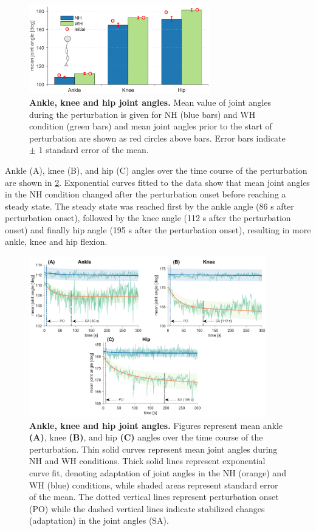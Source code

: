 \begin{figure}[!htb]
	\centering
	\includegraphics[width=0.7\textwidth]{Jernej/figures/jAnglesBars}
	\caption{\textbf{Ankle, knee and hip joint angles. }Mean value of joint angles during the perturbation is given for NH (blue bars) and WH condition (green bars) and mean joint angles prior to the start of perturbation are shown as red circles above bars. Error bars indicate $\pm$ 1 standard error of the mean.
	}
	\label{fig:jAnglesBars}
\end{figure}

Ankle (A), knee (B), and hip (C) angles over the time course of the perturbation are shown in \FigureAbbr \ref{fig:expFit}. Exponential curves fitted to the data show that mean joint angles in the NH condition changed after the perturbation onset before reaching a steady state. The steady state was reached first by the ankle angle (86 s after perturbation onset), followed by the knee angle (112 s after the perturbation onset) and finally hip angle (195 s after the perturbation onset), resulting in more ankle, knee and hip flexion.

\begin{figure}[!htb]
	\centering
	\includegraphics[width=0.92\textwidth]{Jernej/figures/expFit}
	\caption{\textbf{Ankle, knee and hip joint angles. }Figures represent mean ankle \textbf{(A)}, knee \textbf{(B)}, and hip \textbf{(C)} angles over the time course of the perturbation. Thin solid curves represent mean joint angles during NH and WH conditions. Thick solid lines represent exponential curve fit, denoting adaptation of joint angles in the NH (orange) and WH (blue) conditions, while shaded areas represent standard error of the mean. The dotted vertical lines represent perturbation onset (PO) while the dashed vertical lines indicate stabilized changes (adaptation) in the joint angles (SA).
	}
	\label{fig:expFit}
\end{figure}

